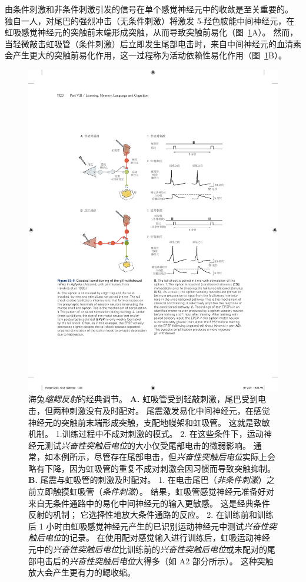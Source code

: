 由条件刺激和非条件刺激引发的信号在单个感觉神经元中的收敛是至关重要的。
独自一人，对尾巴的强烈冲击（无条件刺激）将激发 5-羟色胺能中间神经元，在虹吸感觉神经元的突触前末端形成突触，从而导致突触前易化（图~\ref{fig:53_5}A）。
然而，当轻微敲击虹吸管（条件刺激）后立即发生尾部电击时，来自中间神经元的血清素会产生更大的突触前易化作用，这一过程称为活动依赖性易化作用（图~\ref{fig:53_5}B）。


\begin{figure}[htbp]
	\centering
	\includegraphics[width=0.9\linewidth]{chap53/fig_53_5}
	\caption{海兔\textit{缩鳃反射}的经典调节\cite{hawkins1983cellular}。
		\textbf{A.} 虹吸管受到轻敲刺激，尾巴受到电击，但两种刺激没有及时配对。
		尾震激发易化中间神经元，在感觉神经元的突触前末端形成突触，支配地幔架和虹吸管。
		这就是致敏机制。
		1.训练过程中不成对刺激的模式。
		2. 在这些条件下，运动神经元测试\textit{兴奋性突触后电位}的大小仅受尾部电击的微弱影响。
		通常，如本例所示，尽管存在尾部电击，但\textit{兴奋性突触后电位}实际上会略有下降，因为虹吸管的重复不成对刺激会因习惯而导致突触抑制。
		\textbf{B.} 尾震与虹吸管的刺激及时配对。
		1. 在电击尾巴（\textit{非条件刺激}）之前立即触摸虹吸管（\textit{条件刺激}）。
		结果，虹吸管感觉神经元准备好对来自无条件通路中的易化中间神经元的输入更敏感。
		这是经典条件反射的机制；
		它选择性地放大条件通路的反应。
		2. 在训练前和训练后 1 小时由虹吸感觉神经元产生的已识别运动神经元中测试\textit{兴奋性突触后电位}的记录。
		在使用配对感觉输入进行训练后，虹吸运动神经元中的\textit{兴奋性突触后电位}比训练前的\textit{兴奋性突触后电位}或未配对的尾部电击后的\textit{兴奋性突触后电位}大得多（如 A2 部分所示）。
		这种突触放大会产生更有力的鳃收缩。}
	\label{fig:53_5}
\end{figure}


